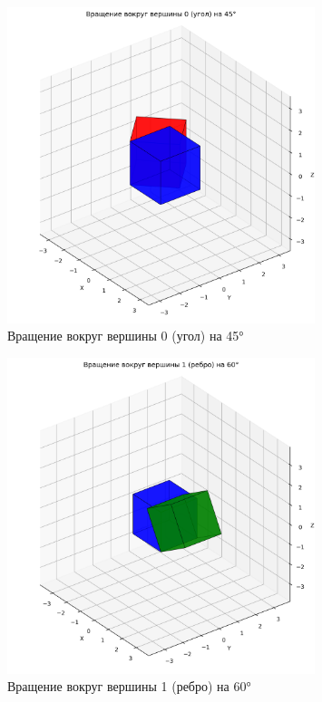 \begin{figure}[H]
\centering
\includegraphics[width=0.8\textwidth]{images/task5/rotate_around_vertex_0.png}
\caption{Вращение вокруг вершины 0 (угол) на 45°}
\end{figure}

\begin{figure}[H]
\centering
\includegraphics[width=0.8\textwidth]{images/task5/rotate_around_vertex_1.png}
\caption{Вращение вокруг вершины 1 (ребро) на 60°}
\end{figure}

